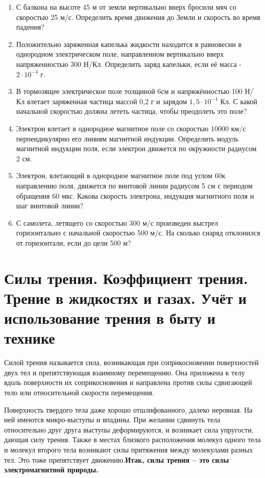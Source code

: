 \documentclass[a5paper, 10pt]{diss_4}
\renewcommand{\'}{\,'}
\begin{document}
\begin{enumerate}

\item С балкона на высоте 45 м от земли вертикально вверх бросили мяч со скоростью 25 м/с. Определить время движения до Земли и скорость во время падения?

\item Положительно заряженная капелька жидкости находится в равновесии в однородном электрическом поле, направленном  вертикально вверх напряженностью 300 Н/Кл. Определить заряд капельки, если её масса  - $2\cdot10^{-4}$ г.

\item В тормозящее электрическое поле толщиной 6см и напряжённостью 100 Н/Кл влетает заряженная частица массой 0,2 г и зарядом
$1,5\cdot10^{-4}$ Кл. С какой начальной скоростью должна лететь частица, чтобы преодолеть это поле?

\item Электрон влетает в однородное магнитное поле со скоростью 10000 км/с перпендикулярно его линиям магнитной индукции. Определить модуль магнитной индукции поля, если электрон движется по окружности радиусом 2 см.

\item Электрон, влетающий в однородное магнитное поле под углом 60\textdegree к направлению поля, движется по винтовой линии радиусом 5 см с периодом обращения 60 мкс. Какова скорость электрона, индукция магнитного поля и шаг винтовой линии?

\item С самолета, летящего со скоростью 300 м/с произведен выстрел горизонтально с начальной скоростью 500 м/с. На сколько снаряд отклонился от горизонтали, если до цели  500 м?

\end{enumerate}


\section{Силы трения. Коэффициент трения. Трение в жидкостях и газах. Учёт и использование трения в быту и технике}

Силой трения называется сила, возникающая при соприкосновении поверхностей двух тел и препятствующая взаимному перемещению. Она приложена к телу вдоль поверхности их соприкосновения и направлена против силы сдвигающей тело или относительной скорости перемещения.

Поверхность твердого тела даже хорошо отшлифованного, далеко неровная. На ней имеются микро-выступы и впадины. При желании сдвинуть тела относительно друг друга выступы деформируются, и возникает сила упругости, дающая силу трения. Также в местах близкого расположения молекул одного тела и молекул второго тела возникают силы притяжения между молекулами разных тел. Это тоже препятствует движению.\textbf{Итак, силы трения -- это силы электромагнитной природы.}
\end{document}
